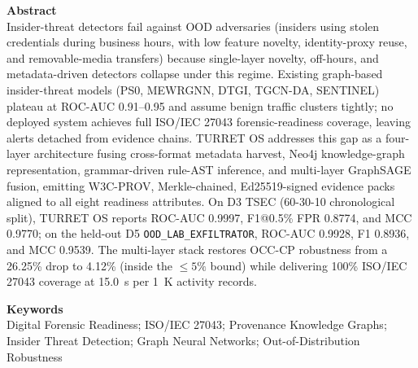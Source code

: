 \documentclass[11pt,a4paper]{article}
\begin{document}
\textbf{Abstract} \\
Insider-threat detectors fail against OOD adversaries (insiders using stolen credentials during business hours, with low feature novelty, identity-proxy reuse, and removable-media transfers) because single-layer novelty, off-hours, and metadata-driven detectors collapse under this regime. Existing graph-based insider-threat models (PS0, MEWRGNN, DTGI, TGCN-DA, SENTINEL) plateau at ROC-AUC 0.91--0.95 and assume benign traffic clusters tightly; no deployed system achieves full ISO/IEC 27043 forensic-readiness coverage, leaving alerts detached from evidence chains. TURRET OS addresses this gap as a four-layer architecture fusing cross-format metadata harvest, Neo4j knowledge-graph representation, grammar-driven rule-AST inference, and multi-layer GraphSAGE fusion, emitting W3C-PROV, Merkle-chained, Ed25519-signed evidence packs aligned to all eight readiness attributes. On D3 TSEC (60-30-10 chronological split), TURRET OS reports ROC-AUC 0.9997, F1@0.5\% FPR 0.8774, and MCC 0.9770; on the held-out D5 \texttt{OOD\_LAB\_EXFILTRATOR}, ROC-AUC 0.9928, F1 0.8936, and MCC 0.9539. The multi-layer stack restores OCC-CP robustness from a 26.25\% drop to 4.12\% (inside the $\le 5\%$ bound) while delivering 100\% ISO/IEC 27043 coverage at 15.0~s per 1~K activity records.

\textbf{Keywords} \\
Digital Forensic Readiness; ISO/IEC 27043; Provenance Knowledge Graphs; Insider Threat Detection; Graph Neural Networks; Out-of-Distribution Robustness
\end{document}

